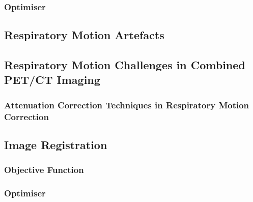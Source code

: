             \subsubsection{Optimiser} \label{iterative_image_reconstruction_optimiser}
                \blindtext
    
        \blindtext
        
        \subsection{Respiratory Motion Artefacts} \label{respiratory_motion_artefacts}
            \blindtext
            
        \subsection{Respiratory Motion Challenges in Combined PET/CT Imaging} \label{respiratory_motion_challenges_in_combined_pet_ct_imaging}
            \blindtext
            
            \subsubsection{Attenuation Correction Techniques in Respiratory Motion Correction} \label{attenuation_correction_techniques_in_respiratory_motion_correction}
                \blindtext
    
        \blindtext
    
        \subsection{Image Registration} \label{image_registration}
            \blindtext
            
            \subsubsection{Objective Function} \label{image_registration_objective_function}
                \blindtext
                
            \subsubsection{Optimiser} \label{image_registration_optimiser}
                \blindtext
            
